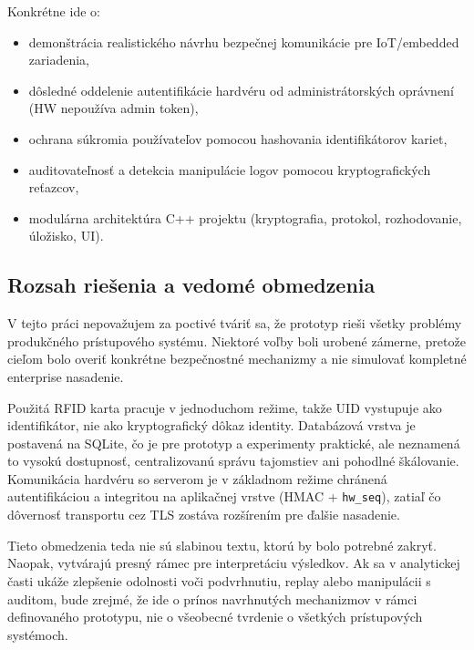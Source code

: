 \documentclass[journal,a4paper,onecolumn]{IEEEtran}
\begin{document}
Konkrétne ide o:

\begin{itemize}[leftmargin=*,itemsep=2pt]
  \item demonštrácia realistického návrhu bezpečnej komunikácie pre IoT/embedded zariadenia,
  \item dôsledné oddelenie autentifikácie hardvéru od administrátorských oprávnení (HW nepoužíva admin token),
  \item ochrana súkromia používateľov pomocou hashovania identifikátorov kariet,
  \item auditovateľnosť a detekcia manipulácie logov pomocou kryptografických reťazcov,
  \item modulárna architektúra C++ projektu (kryptografia, protokol, rozhodovanie, úložisko, UI).
\end{itemize}

\subsection{Rozsah riešenia a vedomé obmedzenia}

V tejto práci nepovažujem za poctivé tváriť sa, že prototyp rieši všetky problémy produkčného prístupového systému. Niektoré voľby boli urobené zámerne, pretože cieľom bolo overiť konkrétne bezpečnostné mechanizmy a nie simulovať kompletné enterprise nasadenie.

Použitá RFID karta pracuje v jednoduchom režime, takže UID vystupuje ako identifikátor, nie ako kryptografický dôkaz identity. Databázová vrstva je postavená na SQLite, čo je pre prototyp a experimenty praktické, ale neznamená to vysokú dostupnosť, centralizovanú správu tajomstiev ani pohodlné škálovanie. Komunikácia hardvéru so serverom je v základnom režime chránená autentifikáciou a integritou na aplikačnej vrstve (HMAC + \texttt{hw\_seq}), zatiaľ čo dôvernosť transportu cez TLS zostáva rozšírením pre ďalšie nasadenie.

Tieto obmedzenia teda nie sú slabinou textu, ktorú by bolo potrebné zakryť. Naopak, vytvárajú presný rámec pre interpretáciu výsledkov. Ak sa v analytickej časti ukáže zlepšenie odolnosti voči podvrhnutiu, replay alebo manipulácii s auditom, bude zrejmé, že ide o prínos navrhnutých mechanizmov v rámci definovaného prototypu, nie o všeobecné tvrdenie o všetkých prístupových systémoch.
\end{document}

